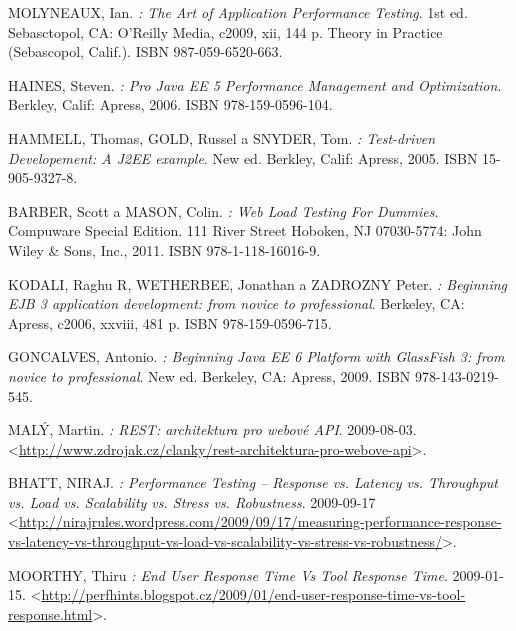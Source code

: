 \documentclass[122pt,oneside]{fithesis}
\begin{document}
\begin{thebibliography}{99}

MOLYNEAUX, Ian.
\emph{: The Art of Application Performance Testing}.
1st ed. Sebasctopol, CA: O'Reilly Media, c2009, xii, 144 p. Theory in Practice (Sebascopol, Calif.). 
ISBN 987-059-6520-663.

HAINES, Steven.
\emph{: Pro Java EE 5 Performance Management and Optimization}.
Berkley, Calif: Apress, 2006.
ISBN 978-159-0596-104.

HAMMELL, Thomas, GOLD, Russel a SNYDER, Tom.
\emph{: Test-driven Developement: A J2EE example}.
New ed. Berkley, Calif: Apress, 2005.
ISBN 15-905-9327-8.

BARBER, Scott a MASON, Colin.
\emph{: Web Load Testing For Dummies}.
Compuware Special Edition. 111 River Street Hoboken, NJ 07030-5774: John Wiley \& Sons, Inc., 2011.
ISBN 978-1-118-16016-9.
	  
KODALI, Raghu R, WETHERBEE, Jonathan a ZADROZNY Peter.
\emph{: Beginning EJB 3 application development: from novice to professional}.
Berkeley, CA: Apress, c2006, xxviii, 481 p.
ISBN 978-159-0596-715. 

GONCALVES, Antonio.
\emph{: Beginning Java EE 6 Platform with GlassFish 3: from novice to professional}.
New ed. Berkeley, CA: Apress, 2009.
ISBN 978-143-0219-545. 

MALÝ, Martin.
\emph{: REST: architektura pro webové API}.
2009-08-03.
\textless\href{http://www.zdrojak.cz/clanky/rest-architektura-pro-webove-api/}{http://www.zdrojak.cz/clanky/rest-architektura-pro-webove-api}\textgreater.

BHATT, NIRAJ.
\emph{: Performance Testing – Response vs. Latency vs. Throughput vs. Load vs. Scalability vs. Stress vs. Robustness}.
2009-09-17
\textless\href{http://nirajrules.wordpress.com/2009/09/17/measuring-performance-response-vs-latency-vs-throughput-vs-load-vs-scalability-vs-stress-vs-robustness/}{http://nirajrules.wordpress.com/2009/09/17/measuring-performance-response-vs-latency-vs-throughput-vs-load-vs-scalability-vs-stress-vs-robustness/}\textgreater.

MOORTHY, Thiru
\emph{:  End User Response Time Vs Tool Response Time}.
2009-01-15.
\textless\href{http://perfhints.blogspot.cz/2009/01/end-user-response-time-vs-tool-response.html}{http://perfhints.blogspot.cz/2009/01/end-user-response-time-vs-tool-response.html}\textgreater.


\end{thebibliography}
\end{document}
